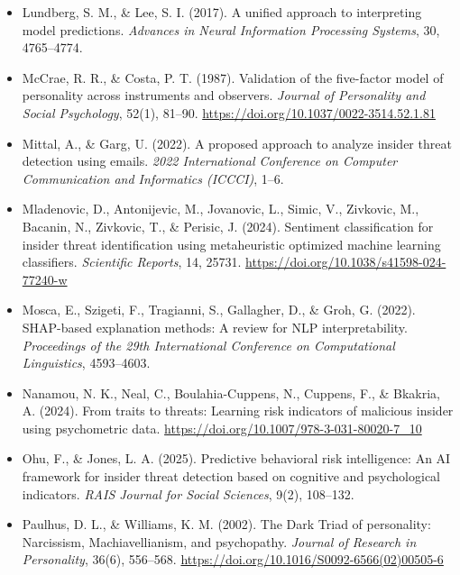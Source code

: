 \documentclass[IB]{TFUOC}%
\begin{document}
\begin{itemize}
    \item Lundberg, S. M., \& Lee, S. I. (2017). A unified approach to 
    interpreting model predictions. \textit{Advances in Neural Information 
    Processing Systems}, 30, 4765--4774.

    \item McCrae, R. R., \& Costa, P. T. (1987). Validation of the five-factor 
    model of personality across instruments and observers. \textit{Journal of 
    Personality and Social Psychology}, 52(1), 81--90. 
    \url{https://doi.org/10.1037/0022-3514.52.1.81}

    \item Mittal, A., \& Garg, U. (2022). A proposed approach to analyze 
    insider threat detection using emails. \textit{2022 International 
    Conference on Computer Communication and Informatics (ICCCI)}, 1--6.

    \item Mladenovic, D., Antonijevic, M., Jovanovic, L., Simic, V., Zivkovic, 
    M., Bacanin, N., Zivkovic, T., \& Perisic, J. (2024). Sentiment 
    classification for insider threat identification using metaheuristic 
    optimized machine learning classifiers. \textit{Scientific Reports}, 14, 
    25731. \url{https://doi.org/10.1038/s41598-024-77240-w}

    \item Mosca, E., Szigeti, F., Tragianni, S., Gallagher, D., \& Groh, G. 
    (2022). SHAP-based explanation methods: A review for NLP interpretability. 
    \textit{Proceedings of the 29th International Conference on Computational 
    Linguistics}, 4593--4603.

    \item Nanamou, N. K., Neal, C., Boulahia-Cuppens, N., Cuppens, F., \& 
    Bkakria, A. (2024). From traits to threats: Learning risk indicators of 
    malicious insider using psychometric data. 
    \url{https://doi.org/10.1007/978-3-031-80020-7_10}

    \item Ohu, F., \& Jones, L. A. (2025). Predictive behavioral risk 
    intelligence: An AI framework for insider threat detection based on 
    cognitive and psychological indicators. \textit{RAIS Journal for Social 
    Sciences}, 9(2), 108--132.

    \item Paulhus, D. L., \& Williams, K. M. (2002). The Dark Triad of personality: Narcissism, Machiavellianism, and psychopathy. \textit{Journal of Research in Personality}, 36(6), 556--568.
    \url{https://doi.org/10.1016/S0092-6566(02)00505-6}


\end{itemize}
\end{document}
